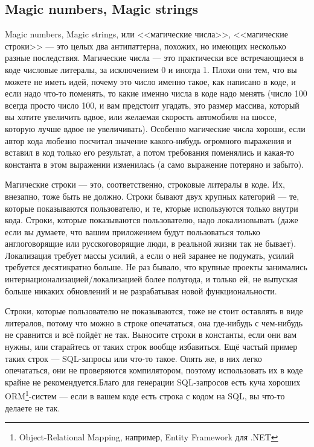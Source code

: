 \documentclass{../../text-style}
\begin{document}
\subsection{Magic numbers, Magic strings}

Magic numbers, Magic strings, или <<магические числа>>, <<магические строки>> --- это целых два антипаттерна, похожих, но имеющих несколько разные последствия. Магические числа --- это практически все встречающиеся в коде числовые литералы, за исключением 0 и иногда 1. Плохи они тем, что вы можете не иметь идей, почему это число именно такое, как написано в коде, и если надо что-то поменять, то какие именно числа в коде надо менять (число 100 всегда просто число 100, и вам предстоит угадать, это размер массива, который вы хотите увеличить вдвое, или желаемая скорость автомобиля на шоссе, которую лучше вдвое не увеличивать). Особенно магические числа хороши, если автор кода любезно посчитал значение какого-нибудь огромного выражения и вставил в код только его результат, а потом требования поменялись и какая-то константа в этом выражении изменилась (а само выражение потеряно и забыто).

Магические строки --- это, соответственно, строковые литералы в коде. Их, внезапно, тоже быть не должно. Строки бывают двух крупных категорий --- те, которые показываются пользователю, и те, кторые используются только внутри кода. Строки, которые показываются пользователю, надо локализовывать (даже если вы думаете, что вашим приложением будут пользоваться только англоговорящие или русскоговорящие люди, в реальной жизни так не бывает). Локализация требует массы усилий, а если о ней заранее не подумать, усилий требуется десятикратно больше. Не раз бывало, что крупные проекты занимались интернационализацией/локализацией более полугода, и только ей, не выпуская больше никаких обновлений и не разрабатывая новой функциональности.

Строки, которые пользователю не показываются, тоже не стоит оставлять в виде литералов, потому что можно в строке опечататься, она где-нибудь с чем-нибудь не сравнится и всё пойдёт не так. Выносите строки в константы, если они вам нужны, или старайтесь от таких строк вообще избавиться. Ещё частый пример таких строк --- SQL-запросы или что-то такое. Опять же, в них легко опечататься, они не проверяются компилятором, поэтому использовать их в коде крайне не рекомендуется.Благо для генерации SQL-запросов есть куча хороших ORM\footnote{Object-Relational Mapping, например, Entity Framework для .NET}-систем --- если в вашем коде есть строка с кодом на SQL, вы что-то делаете не так.
\end{document}
